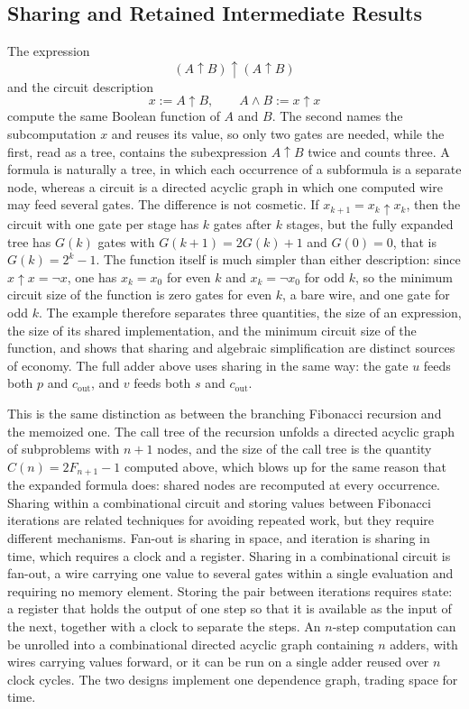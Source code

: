 \documentclass[11pt]{article}
\theoremstyle{definition}
\theoremstyle{remark}
\newcommand{\nand}{\uparrow}
\begin{document}
\subsection{Sharing and Retained Intermediate Results}

The expression
\[
(A \nand B) \nand (A \nand B)
\]
and the circuit description
\[
x := A \nand B, \qquad A \land B := x \nand x
\]
compute the same Boolean function of $A$ and $B$. The second names the subcomputation $x$ and reuses its value, so only two gates are needed, while the first, read as a tree, contains the subexpression $A \nand B$ twice and counts three. A formula is naturally a tree, in which each occurrence of a subformula is a separate node, whereas a circuit is a directed acyclic graph in which one computed wire may feed several gates. The difference is not cosmetic. If $x_{k+1} = x_k \nand x_k$, then the circuit with one gate per stage has $k$ gates after $k$ stages, but the fully expanded tree has $G(k)$ gates with $G(k+1) = 2G(k) + 1$ and $G(0) = 0$, that is $G(k) = 2^{k} - 1$. The function itself is much simpler than either description: since $x \nand x = \neg x$, one has $x_k = x_0$ for even $k$ and $x_k = \neg x_0$ for odd $k$, so the minimum circuit size of the function is zero gates for even $k$, a bare wire, and one gate for odd $k$. The example therefore separates three quantities, the size of an expression, the size of its shared implementation, and the minimum circuit size of the function, and shows that sharing and algebraic simplification are distinct sources of economy. The full adder above uses sharing in the same way: the gate $u$ feeds both $p$ and $c_{\mathrm{out}}$, and $v$ feeds both $s$ and $c_{\mathrm{out}}$.

This is the same distinction as between the branching Fibonacci recursion and the memoized one. The call tree of the recursion unfolds a directed acyclic graph of subproblems with $n+1$ nodes, and the size of the call tree is the quantity $C(n) = 2F_{n+1} - 1$ computed above, which blows up for the same reason that the expanded formula does: shared nodes are recomputed at every occurrence. Sharing within a combinational circuit and storing values between Fibonacci iterations are related techniques for avoiding repeated work, but they require different mechanisms. Fan-out is sharing in space, and iteration is sharing in time, which requires a clock and a register. Sharing in a combinational circuit is fan-out, a wire carrying one value to several gates within a single evaluation and requiring no memory element. Storing the pair between iterations requires state: a register that holds the output of one step so that it is available as the input of the next, together with a clock to separate the steps. An $n$-step computation can be unrolled into a combinational directed acyclic graph containing $n$ adders, with wires carrying values forward, or it can be run on a single adder reused over $n$ clock cycles. The two designs implement one dependence graph, trading space for time.
\end{document}
